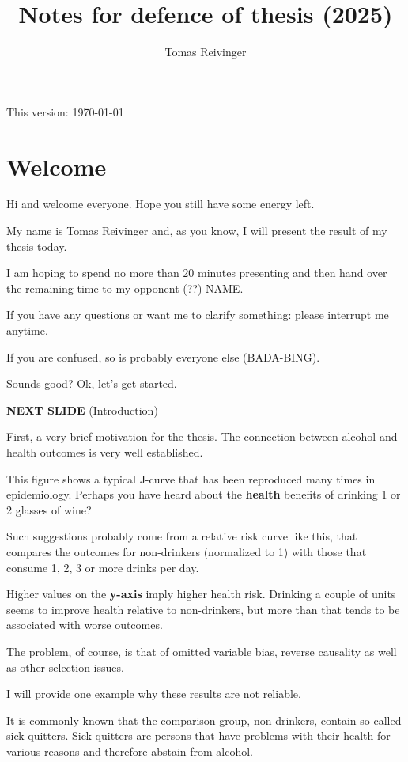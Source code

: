 \documentclass[12pt]{article}
\title{Notes for defence of thesis (2025)}
\date{}
\author{Tomas Reivinger}
\begin{document}
\maketitle
\thispagestyle{empty} %
\begin{center} This version: \today\end{center}

\section{Welcome}
Hi and welcome everyone. Hope you still have some energy left.

My name is Tomas Reivinger and, as you know, I will present the result of my thesis today. 

I am hoping to spend no more than 20 minutes presenting and then hand over the remaining time to my opponent (??) NAME. 

If you have any questions or want me to clarify something: please interrupt me anytime. 

If you are confused, so is probably everyone else (BADA-BING).

Sounds good? Ok, let's get started.

\textbf{NEXT SLIDE} (Introduction)

First, a very brief motivation for the thesis. The connection between alcohol and health outcomes is very well established. 

This figure shows a typical J-curve that has been reproduced many times in epidemiology. Perhaps you have heard about the  \textbf{health} benefits of drinking 1 or 2 glasses of wine? 

Such suggestions probably come from a relative risk curve like this, that compares the outcomes for non-drinkers (normalized to 1) with those that consume 1, 2, 3 or more drinks per day. 

Higher values on the  \textbf{y-axis} imply higher health risk. Drinking a couple of units seems to improve health relative to non-drinkers, but more than that tends to be associated with worse outcomes.

The problem, of course, is that of omitted variable bias, reverse causality as well as other selection issues. 

I will provide one example why these results are not reliable. 

It is commonly known that the comparison group,  non-drinkers, contain so-called sick quitters. Sick quitters are persons that have problems with their health for various reasons and therefore abstain from alcohol.
\end{document}
